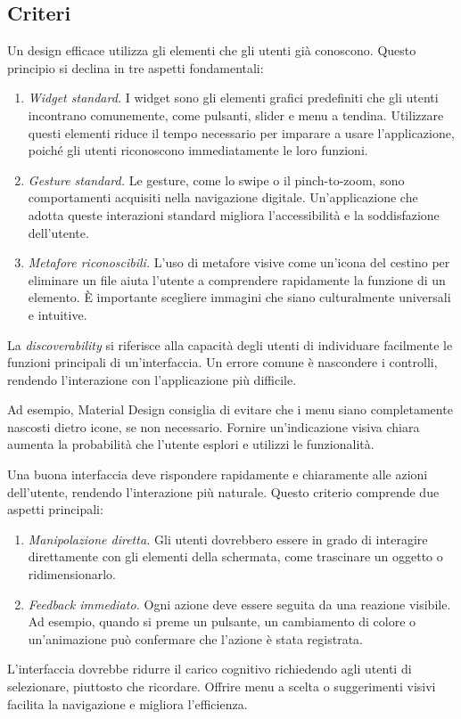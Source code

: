 \subsection{Criteri}
Un design efficace utilizza gli elementi che gli utenti già conoscono. Questo principio si declina in tre aspetti fondamentali:
\begin{enumerate}
    \item \textit{Widget standard.} I widget sono gli elementi grafici predefiniti che gli utenti incontrano comunemente, come pulsanti, slider e menu a tendina. Utilizzare questi elementi riduce il tempo necessario per imparare a usare l'applicazione, poiché gli utenti riconoscono immediatamente le loro funzioni.
    \item \textit{Gesture standard.} Le gesture, come lo swipe o il pinch-to-zoom, sono comportamenti acquisiti nella navigazione digitale. Un'applicazione che adotta queste interazioni standard migliora l'accessibilità e la soddisfazione dell'utente.
    \item \textit{Metafore riconoscibili.} L'uso di metafore visive come un'icona del cestino per eliminare un file aiuta l'utente a comprendere rapidamente la funzione di un elemento. È importante scegliere immagini che siano culturalmente universali e intuitive.
\end{enumerate}
La \textit{discoverability} si riferisce alla capacità degli utenti di individuare facilmente le funzioni principali di un'interfaccia. Un errore comune è nascondere i controlli, rendendo l'interazione con l'applicazione più difficile.

Ad esempio, Material Design consiglia di evitare che i menu siano completamente nascosti dietro icone, se non necessario. Fornire un'indicazione visiva chiara aumenta la probabilità che l'utente esplori e utilizzi le funzionalità.

Una buona interfaccia deve rispondere rapidamente e chiaramente alle azioni dell'utente, rendendo l'interazione più naturale. Questo criterio comprende due aspetti principali:
\begin{enumerate}
    \item \textit{Manipolazione diretta.} Gli utenti dovrebbero essere in grado di interagire direttamente con gli elementi della schermata, come trascinare un oggetto o ridimensionarlo.
    \item \textit{Feedback immediato.} Ogni azione deve essere seguita da una reazione visibile. Ad esempio, quando si preme un pulsante, un cambiamento di colore o un'animazione può confermare che l'azione è stata registrata.
\end{enumerate}
L'interfaccia dovrebbe ridurre il carico cognitivo richiedendo agli utenti di selezionare, piuttosto che ricordare. Offrire menu a scelta o suggerimenti visivi facilita la navigazione e migliora l'efficienza.

